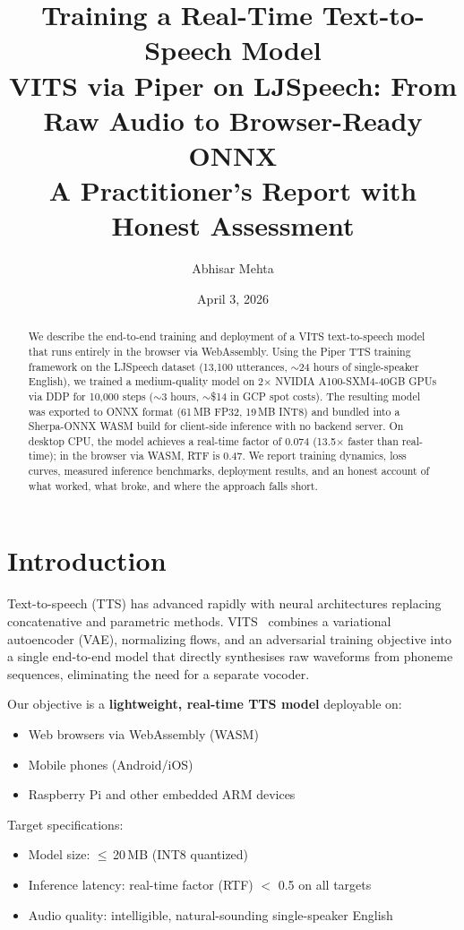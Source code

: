\documentclass[10pt,a4paper,twocolumn]{article}
\title{%
    \textbf{Training a Real-Time Text-to-Speech Model} \\[0.3em]
    \large VITS via Piper on LJSpeech: From Raw Audio to Browser-Ready ONNX \\[0.2em]
    \normalsize A Practitioner's Report with Honest Assessment
}
\author{Abhisar Mehta}
\date{April 3, 2026}
\begin{document}
\maketitle

\begin{abstract}
We describe the end-to-end training and deployment of a VITS text-to-speech model that runs entirely in the browser via WebAssembly. Using the Piper TTS training framework on the LJSpeech dataset (13,100 utterances, $\sim$24 hours of single-speaker English), we trained a medium-quality model on 2$\times$ NVIDIA A100-SXM4-40GB GPUs via DDP for 10,000 steps ($\sim$3 hours, $\sim$\$14 in GCP spot costs). The resulting model was exported to ONNX format (61\,MB FP32, 19\,MB INT8) and bundled into a Sherpa-ONNX WASM build for client-side inference with no backend server. On desktop CPU, the model achieves a real-time factor of 0.074 (13.5$\times$ faster than real-time); in the browser via WASM, RTF is 0.47. We report training dynamics, loss curves, measured inference benchmarks, deployment results, and an honest account of what worked, what broke, and where the approach falls short.
\end{abstract}

\tableofcontents
\newpage

\section{Introduction}
\label{sec:intro}

Text-to-speech (TTS) has advanced rapidly with neural architectures replacing concatenative and parametric methods. VITS~\cite{kim2021vits} combines a variational autoencoder (VAE), normalizing flows, and an adversarial training objective into a single end-to-end model that directly synthesises raw waveforms from phoneme sequences, eliminating the need for a separate vocoder.

Our objective is a \textbf{lightweight, real-time TTS model} deployable on:
\begin{itemize}[nosep]
    \item Web browsers via WebAssembly (WASM)
    \item Mobile phones (Android/iOS)
    \item Raspberry Pi and other embedded ARM devices
\end{itemize}

Target specifications:
\begin{itemize}[nosep]
    \item Model size: $\leq$\,20\,MB (INT8 quantized)
    \item Inference latency: real-time factor (RTF) $<$ 0.5 on all targets
    \item Audio quality: intelligible, natural-sounding single-speaker English
\end{itemize}
\end{document}
